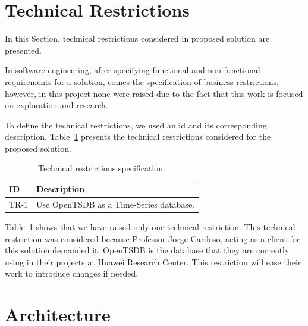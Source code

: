 \section{Technical Restrictions}
\label{sec:technical_restrictions}

In this Section, technical restrictions considered in proposed solution are presented.

In software engineering, after specifying functional and non-functional requirements for a solution, comes the specification of business restrictions, however, in this project none were raised due to the fact that this work is focused on exploration and research.

To define the technical restrictions, we used an id and its corresponding description. Table~\ref{table:technical_restrictions_specification} presents the technical restrictions considered for the proposed solution.

\begin{table}[H]
    \caption{Technical restrictions specification.}
    \label{table:technical_restrictions_specification}
    \centering
    \begin{tabularx}{\linewidth} {
        |>{\hsize=0.25\hsize}X|
        >{\hsize=0.75\hsize}X| }
        \cline{1-2}
        \textbf{ID}
         & \textbf{Description}                    \\ \hline
        TR-1
         & Use OpenTSDB as a Time-Series database. \\ \hline
    \end{tabularx}
\end{table}

Table~\ref{sec:technical_restrictions} shows that we have raised only one technical restriction. This technical restriction was considered because Professor Jorge Cardoso, acting as a client for this solution demanded it. OpenTSDB is the database that they are currently using in their projects at Huawei Research Center. This restriction will ease their work to introduce changes if needed.

\section{Architecture}
\label{sec:architecture}


